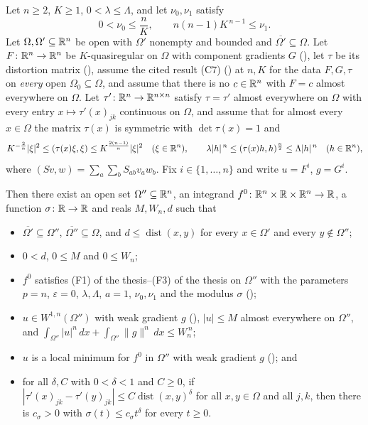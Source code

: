 \begin{lemma}
Let $n\ge2$, $K\ge1$, $0<\lambda\le\Lambda$, and let $\nu_0,\nu_1$ satisfy
\[
0<\nu_0\le\frac nK,\qquad n(n-1)K^{\,n-1}\le\nu_1 .
\]
Let $\Omega,\Omega'\subseteq\mathbb{R}^n$ be open with $\Omega'$ nonempty and bounded and
$\overline{\Omega'}\subseteq\Omega$.  Let $F\colon\mathbb{R}^n\to\mathbb{R}^n$ be
$K$-quasiregular on $\Omega$ with component gradients $G$
(), let $\tau$ be its distortion matrix
(), assume the cited result (C7)
() at $n,K$ for the data $F,G,\tau$ on
\emph{every} open $\Omega_0\subseteq\Omega$, and assume that there is no
$c\in\mathbb{R}^n$ with $F=c$ almost everywhere on $\Omega$.  Let
$\tau'\colon\mathbb{R}^n\to\mathbb{R}^{n\times n}$ satisfy $\tau=\tau'$ almost everywhere on
$\Omega$ with every entry $x\mapsto\tau'(x)_{jk}$ continuous on $\Omega$, and
assume that for almost every $x\in\Omega$ the matrix $\tau(x)$ is symmetric with
$\det\tau(x)=1$ and
\[
K^{-\frac2n}|\xi|^2\le(\tau(x)\xi,\xi)\le K^{\frac{2(n-1)}n}|\xi|^2\quad
(\xi\in\mathbb{R}^n),
\qquad
\lambda|h|^{\,n}\le(\tau(x)h,h)^{\frac n2}\le\Lambda|h|^{\,n}\quad(h\in\mathbb{R}^n),
\]
where $(Sv,w)=\sum_a\sum_bS_{ab}v_aw_b$.  Fix $i\in\{1,\dots,n\}$ and write
$u=F^i$, $g=G^i$.

Then there exist an open set $\Omega''\subseteq\mathbb{R}^n$, an integrand
$f^0\colon\mathbb{R}^n\times\mathbb{R}\times\mathbb{R}^n\to\mathbb{R}$, a function $\sigma\colon\mathbb{R}\to\mathbb{R}$ and
reals $M,W_n,d$ such that
\begin{itemize}
\item[(a)] $\overline{\Omega'}\subseteq\Omega''$,
  $\overline{\Omega''}\subseteq\Omega$, and
  $d\le\operatorname{dist}(x,y)$ for every $x\in\Omega'$ and every
  $y\notin\Omega''$;
\item[(b)] $0<d$, $0\le M$ and $0\le W_n$;
\item[(c)] $f^0$ satisfies (F1) of the thesis--(F3) of the thesis on $\Omega''$ with the
  parameters $p=n$, $\varepsilon=0$, $\lambda,\Lambda$, $a=1$, $\nu_0,\nu_1$ and
  the modulus $\sigma$ ();
\item[(d)] $u\in W^{1,n}(\Omega'')$ with weak gradient $g$
  (), $|u|\le M$ almost everywhere on $\Omega''$, and
  $\int_{\Omega''}|u|^n\,dx+\int_{\Omega''}\|g\|^n\,dx\le W_n^{\,n}$;
\item[(e)] $u$ is a local minimum for $f^0$ in $\Omega''$ with weak gradient $g$
  (); and
\item[(f)] for all $\delta,C$ with $0<\delta<1$ and $C\ge0$, if
  $|\tau'(x)_{jk}-\tau'(y)_{jk}|\le C\operatorname{dist}(x,y)^\delta$ for all
  $x,y\in\Omega$ and all $j,k$, then there is $c_\sigma>0$ with
  $\sigma(t)\le c_\sigma t^\delta$ for every $t\ge0$.
\end{itemize}
\end{lemma}
